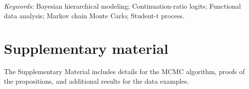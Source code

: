 \documentclass[12pt]{article}
\begin{document}
\begin{abstract}


\end{abstract}

\noindent%
{\it Keywords:} Bayesian hierarchical modeling; %
Continuation-ratio logits; Functional data analysis; Markov chain Monte Carlo; 
Student-t process.

\newpage
{} %



%





\section*{Supplementary material}

The Supplementary Material includes details for the MCMC algorithm, proofs of the propositions, and additional results for the data examples. %



%









\end{document}
